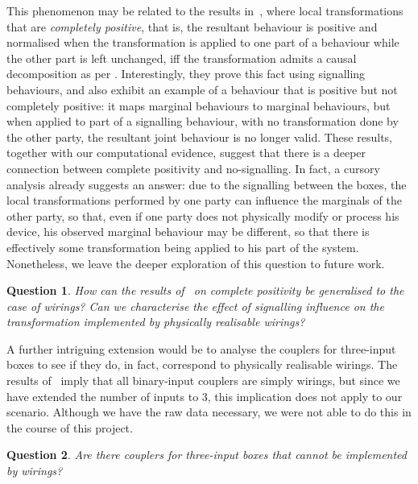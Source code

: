 \documentclass[10pt, a4paper]{article}
\numberwithin{equation}{section} %
\theoremstyle{definition}
\theoremstyle{plain}
\newtheorem{question}{Question}
\newcommand{\?}{\mathrel{?}} %
\begin{document}
                  This phenomenon may be related to the results in~\cite[Sec. 1.5]{LocalTransformations}, where local transformations that are \emph{completely positive}, that is, the resultant behaviour is positive and normalised when the transformation is applied to one part of a behaviour while the other part is left unchanged, iff the transformation admits a causal decomposition as per . Interestingly, they prove this fact using signalling behaviours, and also exhibit an example of a behaviour that is positive but not completely positive: it maps marginal behaviours to marginal behaviours, but when applied to part of a signalling behaviour, with no transformation done by the other party, the resultant joint behaviour is no longer valid. These results, together with our computational evidence, suggest that there is a deeper connection between complete positivity and no-signalling. In fact, a cursory analysis already suggests an answer: due to the signalling between the boxes, the local transformations performed by one party can influence the marginals of the other party, so that, even if one party does not physically modify or process his device, his observed marginal behaviour may be different, so that there is effectively some transformation being applied to his part of the system. Nonetheless, we leave the deeper exploration of this question to future work.
                  \begin{question}
                    How can the results of~\cite{LocalTransformations} on complete positivity be generalised to the case of wirings? Can we characterise the effect of signalling influence on the transformation implemented by physically realisable wirings?
                  \end{question}

                  A further intriguing extension would be to analyse the couplers for three-input boxes to see if they do, in fact, correspond to physically realisable wirings. The results of~\cite{ShortEntangleSwap} imply that all binary-input couplers are simply wirings, but since we have extended the number of inputs to 3, this implication does not apply to our scenario. Although we have the raw data necessary, we were not able to do this in the course of this project.
                  \begin{question}
                    Are there couplers for three-input boxes that cannot be implemented by wirings?
                  \end{question}
\end{document}
